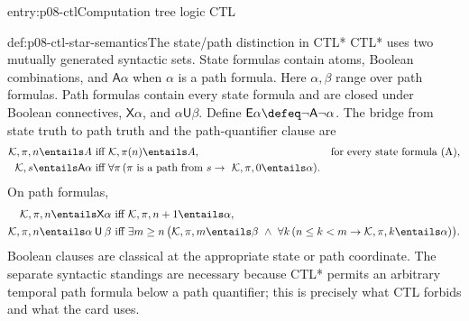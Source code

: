 \begin{systementry}{entry:p08-ctl}{Computation tree logic CTL}
\end{systementry}

\begin{hbdefinition}{def:p08-ctl-star-semantics}{The state/path distinction in CTL*}
CTL* uses two mutually generated syntactic sets.  State formulas contain atoms,
Boolean combinations, and \(\mathsf A\alpha\) when \(\alpha\) is a path
formula.  Here \(\alpha,\beta\) range over path formulas.  Path formulas
contain every state formula and are closed under Boolean connectives,
\(\mathsf X\alpha\), and \(\alpha\mathbin{\mathsf U}\beta\).  Define
\(\mathsf E\alpha\defeq\neg\mathsf A\neg\alpha\).  The bridge from state
truth to path truth and the path-quantifier clause are
\[
 \begin{aligned}
  \mathcal K,\pi,n\entails A
  &\text{ iff } \mathcal K,\pi(n)\entails A,
  &&\text{for every state formula (A)},\\
  \mathcal K,s\entails\mathsf A\alpha
  &\text{ iff }
    \forall\pi\,(\pi\text{ is a path from }s
      \to\ \mathcal K,\pi,0\entails\alpha).
 \end{aligned}
\]
On path formulas,
\[
 \begin{aligned}
  \mathcal K,\pi,n\entails\mathsf X\alpha
  &\text{ iff } \mathcal K,\pi,n+1\entails\alpha,\\
  \mathcal K,\pi,n\entails\alpha\mathbin{\mathsf U}\beta
  &\text{ iff }
    \exists m\ge n\,
      \bigl(\mathcal K,\pi,m\entails\beta\ \land\
      \forall k\,(n\le k<m\to\mathcal K,\pi,k\entails\alpha)\bigr).
 \end{aligned}
\]
Boolean clauses are classical at the appropriate state or path coordinate.
The separate syntactic standings are
necessary because CTL* permits an arbitrary temporal path formula below a path
quantifier; this is precisely what CTL forbids and what the card uses.
\end{hbdefinition}


